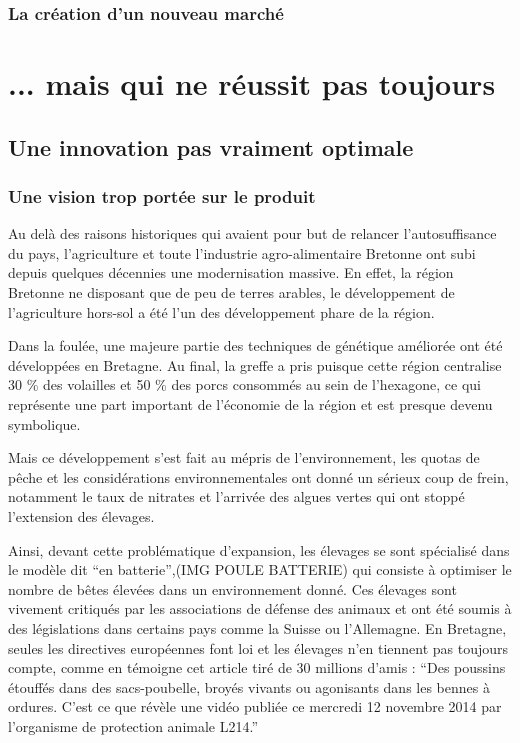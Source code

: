 \documentclass[a4paper,12pt]{report}
\begin{document}
		\subsection{La création d'un nouveau marché}

\chapter{... mais qui ne réussit pas toujours}

	\section{Une innovation pas vraiment optimale}
	
		\subsection{Une vision trop portée sur le produit}
			Au delà des raisons historiques qui avaient pour but de relancer l’autosuffisance du pays, l’agriculture et toute l’industrie agro-alimentaire Bretonne ont subi depuis quelques décennies une modernisation massive. En effet, la région Bretonne ne disposant que de peu de terres arables, le développement de l’agriculture hors-sol a été l’un des développement phare de la région. 
			
			Dans la foulée, une majeure partie des techniques de génétique améliorée ont été développées en Bretagne. Au final, la greffe a pris puisque cette région centralise 30 \% des volailles et 50 \% des porcs consommés au sein de l’hexagone, ce qui représente une part important de l’économie de la région et est presque devenu symbolique.
			
			Mais ce développement s’est fait au mépris de l’environnement, les quotas de pêche et les considérations environnementales ont donné un sérieux coup de frein, notamment le taux de nitrates et l’arrivée des algues vertes qui ont stoppé l’extension des élevages.
			
			Ainsi, devant cette problématique d’expansion, les élevages se sont spécialisé dans le modèle dit “en batterie”,(IMG POULE BATTERIE) qui consiste à optimiser le nombre de bêtes élevées dans un environnement donné. Ces élevages sont vivement critiqués par les associations de défense des animaux  et ont été soumis à des législations dans certains pays comme la Suisse ou l’Allemagne. En Bretagne, seules les directives européennes font loi et les élevages n’en tiennent pas toujours compte, comme en témoigne cet article tiré de 30 millions d’amis\cite{BretagnePoussinsBroyesEtouffesDansCouvoir} : “Des poussins étouffés dans des sacs-poubelle, broyés vivants ou agonisants dans les bennes à ordures. C'est ce que révèle une vidéo publiée ce mercredi 12 novembre 2014 par l’organisme de protection animale L214.”
			
\end{document}
